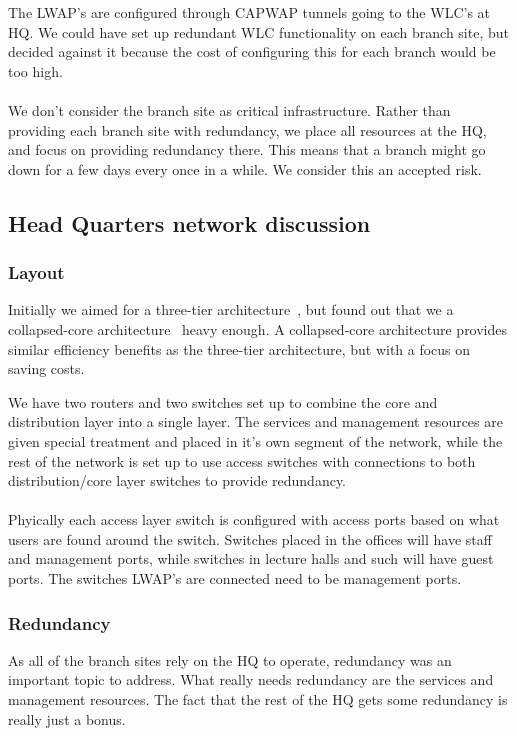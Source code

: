 The LWAP's are configured through CAPWAP tunnels going to the WLC's at HQ. We could have set up redundant WLC functionality on each branch site, but decided against it because the cost of configuring this for each branch would be too high.
\\
\\
We don't consider the branch site as critical infrastructure. Rather than providing each branch site with redundancy, we place all resources at the HQ, and focus on providing redundancy there. This means that a branch might go down for a few days every once in a while. We consider this an accepted risk.

\subsection{Head Quarters network discussion}

\subsubsection{Layout}

Initially we aimed for a three-tier architecture~\cite{todo}, but found out that we a collapsed-core architecture~\cite{todo} heavy enough. A collapsed-core architecture provides similar efficiency benefits as the three-tier architecture, but with a focus on saving costs.

We have two routers and two switches set up to combine the core and distribution layer into a single layer. The services and management resources are given special treatment and placed in it's own segment of the network, while the rest of the network is set up to use access switches with connections to both distribution/core layer switches to provide redundancy.
\\
\\
Phyically each access layer switch is configured with access ports based on what users are found around the switch. Switches placed in the offices will have staff and management ports, while switches in lecture halls and such will have guest ports. The switches LWAP's are connected need to be management ports. 


\subsubsection{Redundancy}

As all of the branch sites rely on the HQ to operate, redundancy was an important topic to address. What really needs redundancy are the services and management resources. The fact that the rest of the HQ gets some redundancy is really just a bonus.

